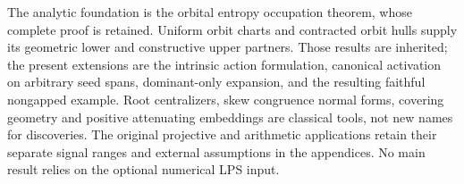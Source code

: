 The analytic foundation is the orbital entropy occupation theorem,
whose complete proof is retained. Uniform orbit charts and contracted
orbit hulls supply its geometric lower and constructive upper partners.
Those results are inherited; the present extensions are the intrinsic
action formulation, canonical activation on arbitrary seed spans,
dominant-only expansion, and the resulting faithful nongapped example.
Root centralizers, skew congruence normal forms, covering geometry and
positive attenuating embeddings are classical tools, not new names
for discoveries. The original projective and arithmetic applications
retain their separate signal ranges and external assumptions in the
appendices. No main result relies on the optional numerical LPS input.
